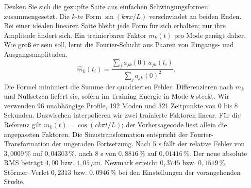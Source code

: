 Denken Sie sich die gezupfte Saite aus einfachen Schwingungsformen zusammengesetzt. Die \(k\)-te Form \(\sin(k\pi x/L)\) verschwindet an beiden Enden. Bei einer idealen linearen Saite bleibt jede Form für sich erhalten; nur ihre Amplitude ändert sich. Ein trainierbarer Faktor \(m_k(t)\) pro Mode genügt daher. Wie groß er sein soll, lernt die Fourier-Schicht aus Paaren von Eingangs- und Ausgangsamplituden.
\[
 \widehat m_k(t_i)=
 \frac{\sum_j a_{jk}(0)\,a_{jk}(t_i)}{\sum_j a_{jk}(0)^2}.
\]
Die Formel minimiert die Summe der quadrierten Fehler. Differenzieren nach \(m_k\) und Nullsetzen liefert sie, sofern im Training Energie in Mode \(k\) steckt. Wir verwenden 96 unabhängige Profile, 192 Moden und 321 Zeitpunkte von 0 bis 8 Sekunden. Dazwischen interpolieren wir zwei trainierte Faktoren linear. Für die Referenz gilt \(m_k(t)=\cos(ck\pi t/L)\); der Vorhersagecode liest allein die angepassten Faktoren. Die Sinustransformation entspricht der Fourier-Transformation der ungeraden Fortsetzung.
Nach 5 s fällt der relative Fehler von \(3{,}0009\,\%\) auf \(0{,}04303\,\%\), nach 8 s von \(0{,}8816\,\%\) auf \(0{,}01416\,\%\). Der neue absolute RMS beträgt \(4{,}00\) bzw. \(4{,}05\,\mu\mathrm m\). Newmark erreicht \(0{,}3745\) bzw. \(0{,}1519\,\%\), Störmer--Verlet \(0{,}2313\) bzw. \(0{,}0946\,\%\) bei den Einstellungen der vorangehenden Studie.

